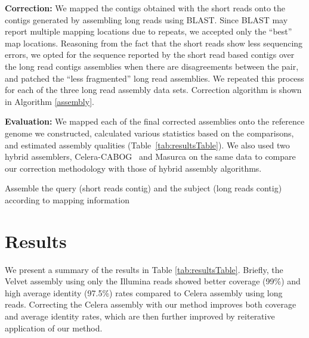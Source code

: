 \documentclass[12pt,a4paper]{cibb}
\begin{document}
\textbf{Correction:} We mapped the contigs obtained with the short reads onto the contigs generated by assembling long reads using BLAST\cite{blast}. Since BLAST may report multiple mapping locations due to repeats, we accepted only the ``best'' map locations. Reasoning from the fact that the short reads show less sequencing errors, we opted for the sequence reported by the short read based contigs over the long read contigs assemblies when there are disagreements between the pair, and patched the ``less fragmented'' long read assemblies. We repeated this process for each of the three long read assembly data sets. Correction algorithm is shown in Algorithm \ref{assembly}.

\textbf{Evaluation:} We mapped each of the final corrected assemblies onto the reference genome we constructed, calculated various statistics based on the comparisons, and estimated assembly qualities (Table~\ref{tab:resultsTable}). We also used  two hybrid assemblers, Celera-CABOG~\cite{cabogMiller:2008} and Masurca \cite{masurcaZimin:2013} on the same data to compare our correction methodology with those of hybrid assembly algorithms.

\begin{algorithm}
\caption{Assemble the query (short reads contig) and the subject (long reads contig) according to mapping information}
\label{assembly}
\begin{algorithmic} 
\ENDIF
{}
\ENDIF
{}
\ENDIF
{}
\ENDIF
\end{algorithmic}
\end{algorithm}

\section{\bf Results}
\label{res}
We present a summary of the results in Table \ref{tab:resultsTable}. Briefly, the Velvet assembly using only the Illumina reads showed better coverage (99\%) and high average identity  (97.5\%) rates compared to Celera assembly using long reads. Correcting the Celera assembly with our method improves both coverage and average identity rates, which are then further improved by reiterative application of our method. 
\end{document}
